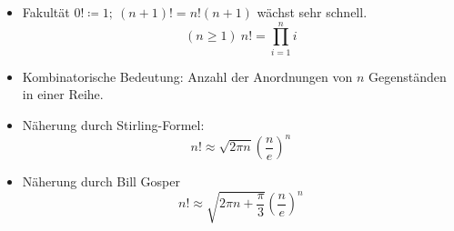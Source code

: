\begin{itemize}
    \item Fakultät $0! \coloneqq 1;\ (n+1)!=n!(n+1)$ wächst sehr schnell.
    \[(n \geq 1)\ n! = \prod\limits_{i=1}^n i\]
    \item Kombinatorische Bedeutung: Anzahl der Anordnungen von $n$ Gegenständen in einer Reihe.
    \item Näherung durch Stirling-Formel:
    \[n! \approx \sqrt{2 \pi n} \left(\frac{n}{e}\right)^n\]
    \item Näherung durch Bill Gosper
    \[n! \approx \sqrt{2 \pi n + \frac{\pi}{3}}\left(\frac{n}{e}\right)^n\]
\end{itemize}
